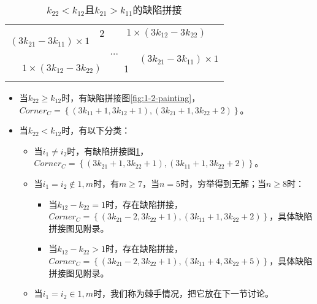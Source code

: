 \begin{table}[htbp]
	\centering
	\caption{$k_{22} < k_{12}$且$k_{21} > k_{11}$的缺陷拼接}
	\begin{tabular}{|cc|ccc|cc|}
		\hline
		\multicolumn{2}{|c|}{\multirow{3}{*}{$(3k_{21} - 3k_{11}) \times 1$}} & 2 & \multicolumn{4}{|c|}{$1 \times  (3k_{12} - 3k_{22})$}                                                                                 \\
		\cline{3-7}
		                                                                      &   & \multicolumn{3}{c}{\multirow{2}{*}{...}}              & \multicolumn{2}{|c|}{\multirow{3}{*}{$(3k_{21} - 3k_{11}) \times 1$}}         \\
		                                                                      &   &                                                       &                                                                       &  &  & \\
		\cline{1-5}
		\multicolumn{4}{|c|}{$1 \times  (3k_{12} - 3k_{22})$}                 & 1 &                                                       &                                                                               \\
		\hline
		\label{fig:2-1-painting-1}
	\end{tabular}
\end{table}

\begin{itemize}
	\item 当$k_{22} \ge k_{12}$时，有缺陷拼接图\ref*{fig:1-2-painting}，\\
	      $Corner_C = \left\{(3k_{11} + 1, 3k_{12} + 1), (3k_{21} + 1, 3k_{22} + 2)\right\}$。
	\item 当$k_{22} < k_{12}$时，有以下分类：
	      \begin{itemize}
		      \item 当$i_1 \neq i_2$时，有缺陷拼接图\ref*{fig:2-1-painting-1}，\\
		            $Corner_C = \left\{(3k_{21} + 1, 3k_{22} + 1), (3k_{11} + 1, 3k_{22} + 2)\right\}$。
		      \item 当$i_1 = i_2 \notin {1, m}$时，有$m \ge 7$，当$n = 5$时，穷举得到无解；当$n \ge 8$时：
		            \begin{itemize}
			            \item 当$k_{12} - k_{22} = 1$时，存在缺陷拼接，\\
			                  $Corner_C = \left\{(3k_{21} - 2, 3k_{22} + 1), (3k_{11} + 1, 3k_{22} + 2)\right\}$，具体缺陷拼接图见附录。
			            \item 当$k_{12} - k_{22} > 1$时，存在缺陷拼接，\\
			                  $Corner_C = \left\{(3k_{21} - 2, 3k_{22} + 1), (3k_{11} + 4, 3k_{22} + 5)\right\}$，具体缺陷拼接图见附录。
		            \end{itemize}
		      \item 当$i_1 = i_2 \in {1, m}$时，我们称为棘手情况，把它放在下一节讨论。
	      \end{itemize}
\end{itemize}


